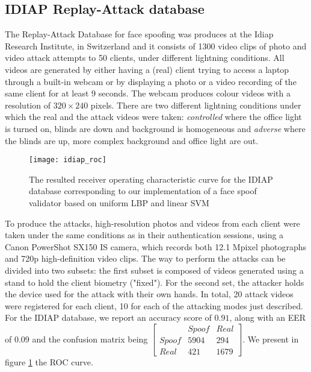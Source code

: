 \subsection{IDIAP Replay-Attack database}
The Replay-Attack Database for face spoofing was produces at the Idiap Research Institute, in Switzerland and it consists of 1300 video clips of photo and video attack attempts to 50 clients, under different lightning conditions. All videos are generated by either having a (real) client trying to access a laptop through a built-in webcam or by displaying a photo or a video recording of the same client for at least 9 seconds. The webcam produces colour videos with a resolution of $320\times240$ pixels. 
There are two different lightning conditions under which the real and the attack videos were taken: \textit{controlled} where the office light is turned on, blinds are down and background is homogeneous and \textit{adverse} where the blinds are up, more complex background and office light are out. 
\begin{figure}[H]
	\captionsetup{width=15cm,font=small}
	\begin{center}
		\texttt{[image: idiap\_roc]}
	\end{center}
	\caption[IDIAP database resulted ROC curve]{The resulted receiver operating characteristic curve for the IDIAP database corresponding to our implementation of a face spoof validator based on uniform LBP and linear SVM}
	\label{fig:idiap_roc}
\end{figure}
To produce the attacks, high-resolution photos and videos from each client were taken under the same conditions as in their authentication sessions, using a Canon PowerShot SX150 IS camera, which records both 12.1 Mpixel photographs and 720p high-definition video clips. The way to perform the attacks can be divided into two subsets: the first subset is composed of videos generated using a stand to hold the client biometry ("fixed"). For the second set, the attacker holds the device used for the attack with their own hands. In total, 20 attack videos were registered for each client, 10 for each of the attacking modes just described.
For the IDIAP database, we report an accuracy score of $0.91$, along with an EER of 0.09 and the confusion matrix being 
$
[
\begin{smallmatrix}
&Spoof & Real\\
Spoof & 5904 & 294\\
Real & 421 & 1679
\end{smallmatrix}] 
$. We present in figure \ref{fig:idiap_roc} the ROC curve.

